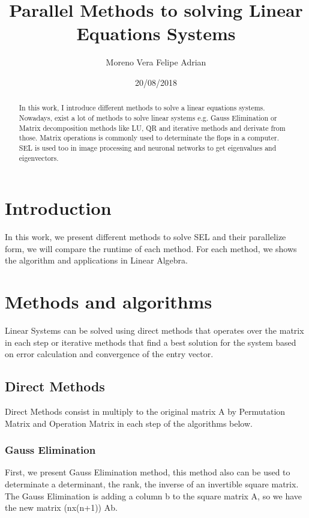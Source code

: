 \documentclass[letterpaper,12pt]{article}
\begin{document}
\title{Parallel Methods to solving Linear Equations Systems}
\author{Moreno Vera Felipe Adrian}
\date{20/08/2018}
\maketitle

\begin{abstract}
In this work, I introduce different methods to solve a linear equations systems. Nowadays, exist a lot of methods to solve linear systems e.g. Gauss Elimination or Matrix decomposition methods like LU, QR and iterative methods and derivate from those. Matrix operations is commonly used to determinate the flops in a computer. 
SEL is used too in image processing and neuronal networks to get eigenvalues and eigenvectors.
\end{abstract}

\section{Introduction}

In this work, we present different methods to solve SEL and their parallelize form, we will compare the runtime of each method.
For each method, we shows the algorithm and applications in Linear Algebra.

\section{Methods and algorithms}

Linear Systems can be solved using direct methods that operates over the matrix in each step or iterative methods that find a best solution for the system based on error calculation and convergence of the entry vector.

\subsection{Direct Methods}

Direct Methods consist in multiply to the original matrix A by Permutation Matrix and Operation Matrix in each step of the algorithms below.

\subsubsection{Gauss Elimination}

First, we present Gauss Elimination method, this method also can be used to determinate a determinant, the rank, the inverse of an invertible square matrix.
The Gauss Elimination is adding a column b to the square matrix A, so we have the new matrix (nx(n+1)) Ab.
\end{document}
